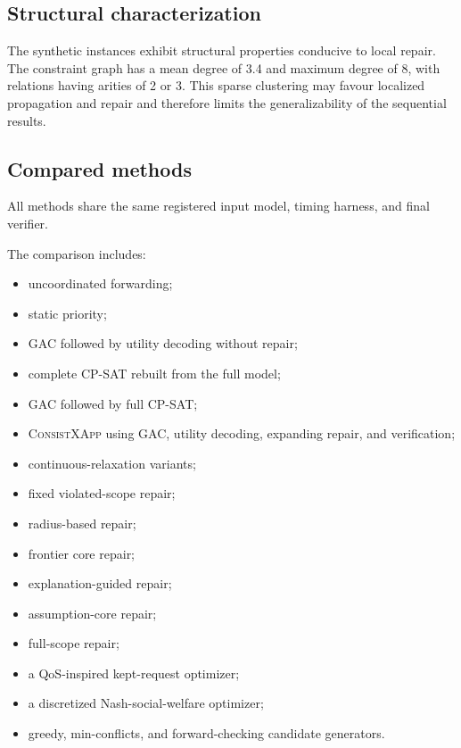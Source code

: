 \documentclass[pdflatex,sn-mathphys-num,iicol,oneside]{sn-jnl}
\newcommand{\method}{\textsc{ConsistXApp}\xspace}
\newcommand{\gac}{\textsc{GAC}\xspace}
\newcommand{\cpsat}{\textsc{CP-SAT}\xspace}
\begin{document}
\subsection{Structural characterization}

The synthetic instances exhibit structural properties conducive to local repair. The constraint graph has a mean degree of 3.4 and maximum degree of 8, with relations having arities of 2 or 3. This sparse clustering may favour localized propagation and repair and therefore limits the generalizability of the sequential results.

\subsection{Compared methods}

All methods share the same registered input model, timing harness, and
final verifier.

The comparison includes:

\begin{itemize}

\item uncoordinated forwarding;

\item static priority;

\item \gac followed by utility decoding without repair;

\item complete \cpsat rebuilt from the full model;

\item \gac followed by full \cpsat;

\item \method using \gac, utility decoding, expanding repair, and
verification;

\item continuous-relaxation variants;

\item fixed violated-scope repair;

\item radius-based repair;

\item frontier core repair;

\item explanation-guided repair;

\item assumption-core repair;

\item full-scope repair;

\item a QoS-inspired kept-request optimizer;

\item a discretized Nash-social-welfare optimizer;

\item greedy, min-conflicts, and forward-checking candidate generators.

\end{itemize}
\end{document}
